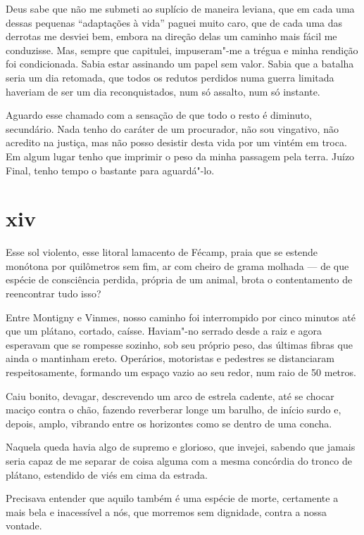 Deus sabe que não me submeti ao suplício de maneira leviana, que em cada
uma dessas pequenas ``adaptações à vida'' paguei muito caro, que de
cada uma das derrotas me desviei bem, embora na direção delas um
caminho mais fácil me conduzisse. Mas, sempre que capitulei,
impuseram"-me a trégua e minha rendição foi condicionada. Sabia estar
assinando um papel sem valor. Sabia que a batalha seria um dia retomada,
que todos os redutos perdidos numa guerra limitada haveriam de ser um
dia reconquistados, num só assalto, num só instante.

Aguardo esse chamado com a sensação de que todo o resto é diminuto,
secundário. Nada tenho do caráter de um procurador, não sou vingativo,
não acredito na justiça, mas não posso desistir desta vida por um vintém
em troca. Em algum lugar tenho que imprimir o peso da minha passagem
pela terra. Juízo Final, tenho tempo o bastante para aguardá"-lo.

\section{xiv}


Esse sol violento, esse litoral lamacento de Fécamp, praia que se
estende monótona por quilômetros sem fim, ar com cheiro de grama
molhada --- de que espécie de consciência perdida, própria de um animal,
brota o contentamento de reencontrar tudo isso?

Entre Montigny e Vinmes, nosso caminho foi interrompido por cinco
minutos até que um plátano, cortado, caísse. Haviam"-no serrado desde a
raiz e agora esperavam que se rompesse sozinho, sob seu próprio peso,
das últimas fibras que ainda o mantinham ereto. Operários, motoristas e
pedestres se distanciaram respeitosamente, formando um espaço vazio ao
seu redor, num raio de 50 metros.

Caiu bonito, devagar, descrevendo um arco de estrela cadente, até se
chocar maciço contra o chão, fazendo reverberar longe um barulho, de
início surdo e, depois, amplo, vibrando entre os horizontes como se
dentro de uma concha.

Naquela queda havia algo de supremo e glorioso, que invejei, sabendo que
jamais seria capaz de me separar de coisa alguma com a mesma
concórdia do tronco de plátano, estendido de viés em cima da estrada.

Precisava entender que aquilo também é uma espécie de morte, certamente
a mais bela e inacessível a nós, que morremos sem dignidade,
contra a nossa vontade.

